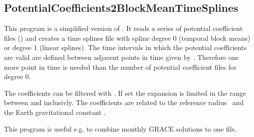 \clearpage
\subsection{PotentialCoefficients2BlockMeanTimeSplines}\label{PotentialCoefficients2BlockMeanTimeSplines}
This program is a simplified version of .
It reads a series of potential coefficient files ()
and creates a time splines file with spline degree 0 (temporal block means) or degree 1 (linear splines).
The time intervals in which the potential coefficients are valid are defined between adjacent
points in time given by . Therefore one more point in time is needed
than the number of potential coefficient files for degree 0.

The coefficients can be filtered with .
If set the expansion is limited in the range between  and  inclusivly.
The coefficients are related to the reference radius~ and the Earth gravitational constant .

This program is useful e.g. to combine monthly GRACE solutions to one file.


